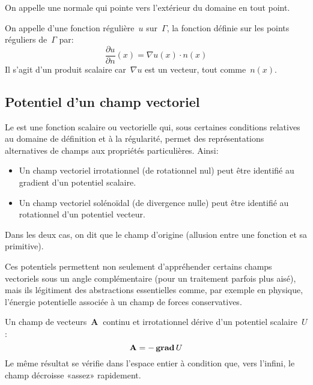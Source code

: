 \medskip
On appelle  une normale qui pointe vers
l'extérieur du domaine en tout point.

\medskip
\begin{definition}
On appelle  d'une fonction régulière~$u$
sur~$\Gamma$, la fonction définie sur les points réguliers de~$\Gamma$ par:
\begin{equation}\dfrac{\partial u}{\partial n}(x)=\nabla u(x)\cdot n(x)\end{equation} Il s'agit d'un produit
scalaire car~$\nabla u$ est un vecteur, tout comme~$n(x)$.
\end{definition}

\medskip
\subsection{Potentiel d'un champ vectoriel}

Le  est une fonction scalaire ou vectorielle qui,
sous certaines conditions relatives au domaine de définition et à la régularité,
permet des représentations alternatives de champs aux propriétés particulières.
Ainsi:
\begin{itemize}
  \item Un champ vectoriel irrotationnel (de rotationnel nul) peut être identifié au gradient d'un potentiel scalaire.
  \item Un champ vectoriel solénoïdal (de divergence nulle) peut être identifié au rotationnel d'un potentiel vecteur.
\end{itemize}
Dans les deux cas, on dit que le champ d'origine 
(allusion entre une fonction et sa primitive).

\medskip
Ces potentiels permettent non seulement d'appréhender certains champs vectoriels sous un angle
complémentaire (pour un traitement parfois plus aisé), mais ils légitiment des abstractions essentielles
comme, par exemple en physique, l'énergie potentielle associée à un champ de forces conservatives.

\medskip
Un champ de vecteurs~$\mathbf{A}~$ continu et irrotationnel dérive d'un potentiel scalaire~$U$:
\begin{equation}
 \mathbf{A} = -\operatorname{\mathbf{grad}} U
\end{equation}
Le même résultat se vérifie dans l'espace entier à condition que, vers l'infini, le champ
décroisse «assez» rapidement.

